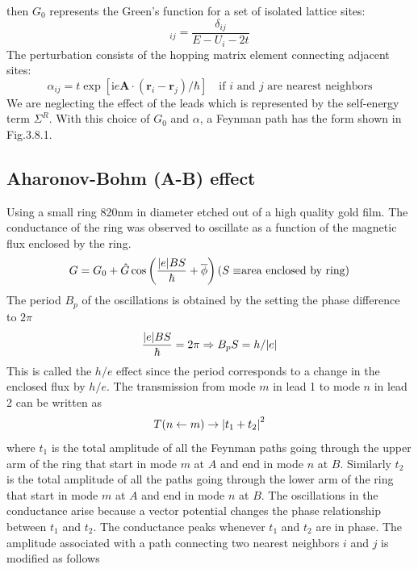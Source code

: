 \documentclass[11pt,a4paper]{book}
\theoremstyle{plain}
\theoremstyle{definition}
\theoremstyle{remark}
\newcommand{\ii}{\mathrm{i}}                      %
\renewcommand{\vec}[1]{\boldsymbol{#1}}
\begin{document}
then $G_0$ represents the Green's function for a set of isolated lattice sites:
\begin{equation}
    [G_0]_{ij} = \frac{\delta_{ij}}{E - U_i - 2t}
\end{equation}
The perturbation consists of the hopping matrix element connecting adjacent sites:
\begin{equation}
    \alpha_{ij} = t \exp[\ii e \vec{A} \cdot (\vec{r}_i - \vec{r}_j)/\hbar] \quad \mbox{if $i$ and $j$ are nearest neighbors}
\end{equation}
We are neglecting the effect of the leads which is represented by the self-energy term $\Sigma^R$. With this choice of $G_0$ and $\alpha$, a Feynman path has the form shown in Fig.3.8.1.

\subsection{Aharonov-Bohm (A-B) effect}
Using a small ring 820nm in diameter etched out of a high quality gold film. The conductance of the ring was observed to oscillate as a function of the magnetic flux enclosed by the ring.
\begin{equation}
    G = G_0 + \hat{G}\cos\left(\frac{\abs{e}B S}{\hbar} + \overline{\phi}\right) \mbox{($S\equiv $area enclosed by ring)}
\end{equation}
The period $B_p$ of the oscillations is obtained by the setting the phase difference to $2\pi$
\begin{equation}
    \frac{\abs{e}B S}{\hbar} = 2 \pi \Rightarrow B_p S = h/\abs{e}
\end{equation}
This is called the $h/e$ effect since the period corresponds to a change in the enclosed flux by $h/e$. The transmission from mode $m$ in lead 1 to mode $n$ in lead 2 can be written as 
\begin{equation}
    T(n\leftarrow m) \rightarrow \abs{t_1+t_2}^2
\end{equation}
where $t_1$ is the total amplitude of all the Feynman paths going through the upper arm of the ring that start in mode $m$ at $A$ and end in mode $n$ at $B$. Similarly $t_2$ is the total amplitude of all the paths going through the lower arm of the ring that start in mode $m$ at $A$ and end in mode $n$ at $B$. The oscillations in the conductance arise because a vector potential changes the phase relationship between $t_1$ and $t_2$. The conductance peaks whenever $t_1$ and $t_2$ are in phase. The amplitude associated with a path connecting two nearest neighbors $i$ and $j$ is modified as follows
\end{document}
